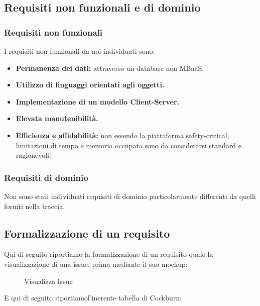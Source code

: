 \documentclass[a4paper, 11pt]{article}
\begin{document}
\subsection{Requisiti non funzionali e di dominio}
\subsubsection{Requisiti non funzionali}
I requisiti non funzionali da noi individuati sono:
\begin{itemize}
    \item \textbf{Permanenza dei dati:} attraverso un database non MBaaS.
    \item \textbf{Utilizzo di linguaggi orientati agli oggetti.}
    \item \textbf{Implementazione di un modello Client-Server.}
    \item \textbf{Elevata manutenibilità.}
    \item \textbf{Efficienza e affidabilità:} non essendo la piattaforma safety-critical, limitazioni di tempo e memoria occupata sono da considerarsi standard e ragionevoli.
\end{itemize}

\subsubsection{Requisiti di dominio}
Non sono stati individuati requisiti di dominio particolarmente differenti da quelli forniti nella traccia.

\newpage
\subsection{Formalizzazione di un requisito}
Qui di seguito riportiamo la formalizzazione di un requisito quale la visualizzazione di una issue, prima mediante il suo mockup:

\begin{figure}[H]
    \centering
    
    \caption{Visualizza Issue}
    \label{fig:visualizza_issue_mockup}
\end{figure}

\newpage
E qui di seguito riportiamol'inerente tabella di Cockburn:


\end{document}
